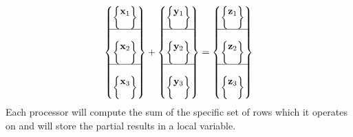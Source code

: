 \documentclass[sigplan,screen]{acmart}
\begin{document}
\begin{equation*}
\begin{Bmatrix}
\begin{Bmatrix}
\mathbf{x}_1\\
\\
\end{Bmatrix}\\
\hline\\
\begin{Bmatrix}
\mathbf{x}_2\\
\\
\end{Bmatrix}\\
\hline\\
\begin{Bmatrix}
\mathbf{x}_3\\
\\
\end{Bmatrix}	
\end{Bmatrix} + 
\begin{Bmatrix}
\begin{Bmatrix}
\mathbf{y}_1\\
\\
\end{Bmatrix}\\
\hline\\
\begin{Bmatrix}
\mathbf{y}_2\\
\\
\end{Bmatrix}\\
\hline\\
\begin{Bmatrix}
\mathbf{y}_3\\
\\
\end{Bmatrix}	
\end{Bmatrix} = 
\begin{Bmatrix}
\begin{Bmatrix}
\mathbf{z}_1\\
\\
\end{Bmatrix}\\
\hline\\
\begin{Bmatrix}
\mathbf{z}_2\\
\\
\end{Bmatrix}\\
\hline\\
\begin{Bmatrix}
\mathbf{z}_3\\
\\
\end{Bmatrix}	
\end{Bmatrix}
\end{equation*}
Each processor will compute the sum of the specific set of rows which it operates on and will store the partial results in a local variable.
\end{document}
